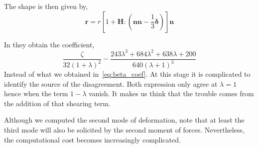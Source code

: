 The shape is then given by,
\begin{equation}
    \textbf{r} = r[1+ \textbf{H}:(\textbf{nn}- \frac{1}{3}\bm\delta)] \textbf{n}
\end{equation}

In \citet{taylor1964deformation} they obtain the coefficient, 
\begin{equation}
    \frac{\zeta}{32(1+\lambda)^2}
    - \frac{243\lambda^3+684\lambda^2+638\lambda+200}{640(\lambda+1)^3} 
\end{equation}
Instead of what we obtained in~\ref{eq:beta_coef}. 
At this stage it is complicated to identify the source of the disagreement. 
Both expression only agree at $\lambda = 1$ hence when the term $1-\lambda$ vanish. 
It makes us think that the trouble comes from the addition of that shearing term. 

Although we computed the second mode of deformation, note that at least the third mode will also be solicited by the second moment of forces. 
Nevertheless, the computational cost becomes increasingly complicated. 